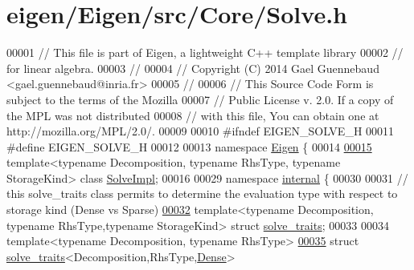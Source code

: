 \hypertarget{eigen_2_eigen_2src_2_core_2_solve_8h_source}{}\section{eigen/\+Eigen/src/\+Core/\+Solve.h}
\label{eigen_2_eigen_2src_2_core_2_solve_8h_source}

\begin{DoxyCode}
00001 \textcolor{comment}{// This file is part of Eigen, a lightweight C++ template library}
00002 \textcolor{comment}{// for linear algebra.}
00003 \textcolor{comment}{//}
00004 \textcolor{comment}{// Copyright (C) 2014 Gael Guennebaud <gael.guennebaud@inria.fr>}
00005 \textcolor{comment}{//}
00006 \textcolor{comment}{// This Source Code Form is subject to the terms of the Mozilla}
00007 \textcolor{comment}{// Public License v. 2.0. If a copy of the MPL was not distributed}
00008 \textcolor{comment}{// with this file, You can obtain one at http://mozilla.org/MPL/2.0/.}
00009 
00010 \textcolor{preprocessor}{#ifndef EIGEN\_SOLVE\_H}
00011 \textcolor{preprocessor}{#define EIGEN\_SOLVE\_H}
00012 
00013 \textcolor{keyword}{namespace }\hyperlink{namespace_eigen}{Eigen} \{
00014 
\hyperlink{class_eigen_1_1_solve_impl}{00015} \textcolor{keyword}{template}<\textcolor{keyword}{typename} Decomposition, \textcolor{keyword}{typename} RhsType, \textcolor{keyword}{typename} StorageKind> \textcolor{keyword}{class }
      \hyperlink{class_eigen_1_1_solve_impl}{SolveImpl};
00016   
00029 \textcolor{keyword}{namespace }\hyperlink{namespaceinternal}{internal} \{
00030 
00031 \textcolor{comment}{// this solve\_traits class permits to determine the evaluation type with respect to storage kind (Dense vs
       Sparse)}
\hyperlink{struct_eigen_1_1internal_1_1solve__traits}{00032} \textcolor{keyword}{template}<\textcolor{keyword}{typename} Decomposition, \textcolor{keyword}{typename} RhsType,\textcolor{keyword}{typename} StorageKind> \textcolor{keyword}{struct }
      \hyperlink{struct_eigen_1_1internal_1_1solve__traits}{solve\_traits};
00033 
00034 \textcolor{keyword}{template}<\textcolor{keyword}{typename} Decomposition, \textcolor{keyword}{typename} RhsType>
\hyperlink{struct_eigen_1_1internal_1_1solve__traits_3_01_decomposition_00_01_rhs_type_00_01_dense_01_4}{00035} \textcolor{keyword}{struct }\hyperlink{struct_eigen_1_1internal_1_1solve__traits}{solve\_traits}<Decomposition,RhsType,\hyperlink{struct_eigen_1_1_dense}{Dense}>

\end{DoxyCode}
